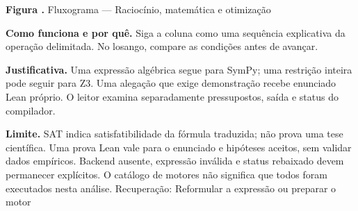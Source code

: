 {\small\textbf{Figura \thefigure.} Fluxograma --- Raciocínio, matemática e otimização}\par\smallskip
\noindent\textbf{Como funciona e por quê.} Siga a coluna como uma sequência explicativa da operação delimitada. No losango, compare as condições antes de avançar.\par
\noindent\textbf{Justificativa.} Uma expressão algébrica segue para SymPy; uma restrição inteira pode seguir para Z3. Uma alegação que exige demonstração recebe enunciado Lean próprio. O leitor examina separadamente pressupostos, saída e status do compilador.\par
\noindent\textbf{Limite.} SAT indica satisfatibilidade da fórmula traduzida; não prova uma tese científica. Uma prova Lean vale para o enunciado e hipóteses aceitos, sem validar dados empíricos. Backend ausente, expressão inválida e status rebaixado devem permanecer explícitos. O catálogo de motores não significa que todos foram executados nesta análise. Recuperação: Reformular a expressão ou preparar o motor\par\smallskip
{}

